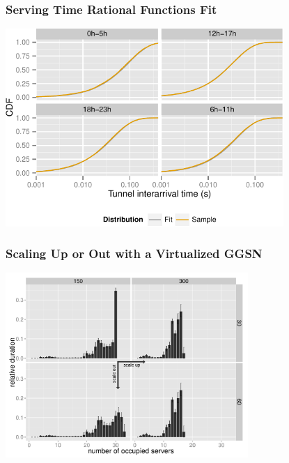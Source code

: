 \documentclass{beamer}
\begin{document}
\begin{frame}
	\frametitle{Serving Time Rational Functions Fit}

	\begin{center}
		\includegraphics[height=7.5cm]{figures/R-IAT-active-fit-cdf-facets.pdf}
	\end{center}
\end{frame}

\begin{frame}
	\frametitle{Scaling Up or Out with a Virtualized GGSN}
	
	\begin{center}
		\includegraphics[height=7cm]{figures/resourceusedistribution-detail-barplot-annotated.pdf}
	\end{center}
\end{frame}
\end{document}
